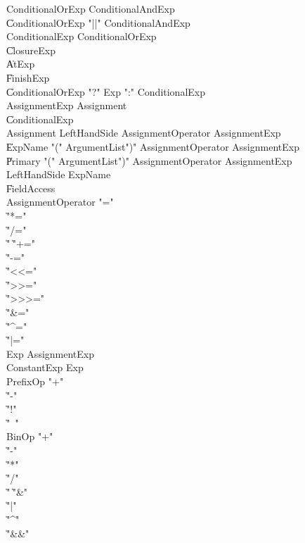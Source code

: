 {\begin{grammar}

 ConditionalOrExp  \: ConditionalAndExp\\
    \| ConditionalOrExp \xcd"||" ConditionalAndExp\\
 ConditionalExp  \: ConditionalOrExp\\
    \| ClosureExp\\
    \| AtExp\\
    \| FinishExp\\
    \| ConditionalOrExp \xcd"?" Exp \xcd":" ConditionalExp\\
 AssignmentExp  \: Assignment\\
    \| ConditionalExp\\
 Assignment  \: LeftHandSide AssignmentOperator AssignmentExp\\
    \| ExpName  \xcd"(" ArgumentList\opt \xcd")" AssignmentOperator AssignmentExp\\
    \| Primary  \xcd"(" ArgumentList\opt \xcd")" AssignmentOperator AssignmentExp\\
 LeftHandSide  \: ExpName\\
    \| FieldAccess\\
 AssignmentOperator  \: \xcd"="\\
    \| \xcd"*="\\
    \| \xcd"/="\\
    \| \xcd"%
    \| \xcd"+="\\
    \| \xcd"-="\\
    \| \xcd"<<="\\
    \| \xcd">>="\\
    \| \xcd">>>="\\
    \| \xcd"&="\\
    \| \xcd"^="\\
    \| \xcd"|="\\
 Exp  \: AssignmentExp\\
 ConstantExp  \: Exp\\
 PrefixOp  \: \xcd"+"\\
    \| \xcd"-"\\
    \| \xcd"!"\\
    \| \xcd"~"\\
 BinOp  \: \xcd"+"\\
    \| \xcd"-"\\
    \| \xcd"*"\\
    \| \xcd"/"\\
    \| \xcd"%
    \| \xcd"&"\\
    \| \xcd"|"\\
    \| \xcd"^"\\
    \| \xcd"&&"\\
\end{grammar}

}
